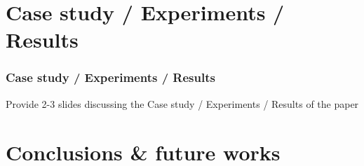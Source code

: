 \documentclass[handout]{beamer}\mode<handout>{\usetheme{AMSBolognaFC}}
\begin{document}
\section{Case study / Experiments / Results}

\begin{frame}%
\frametitle{Case study / Experiments / Results}

    Provide 2-3 slides discussing the Case study / Experiments / Results of the paper

\end{frame}

\section{Conclusions \& future works}
\end{document}
